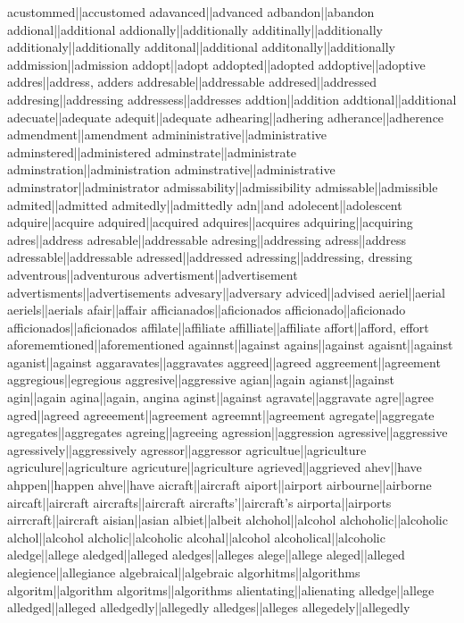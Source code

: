 acustommed||accustomed
adavanced||advanced
adbandon||abandon
addional||additional
addionally||additionally
additinally||additionally
additionaly||additionally
additonal||additional
additonally||additionally
addmission||admission
addopt||adopt
addopted||adopted
addoptive||adoptive
addres||address, adders
addresable||addressable
addresed||addressed
addresing||addressing
addressess||addresses
addtion||addition
addtional||additional
adecuate||adequate
adequit||adequate
adhearing||adhering
adherance||adherence
admendment||amendment
admininistrative||administrative
adminstered||administered
adminstrate||administrate
adminstration||administration
adminstrative||administrative
adminstrator||administrator
admissability||admissibility
admissable||admissible
admited||admitted
admitedly||admittedly
adn||and
adolecent||adolescent
adquire||acquire
adquired||acquired
adquires||acquires
adquiring||acquiring
adres||address
adresable||addressable
adresing||addressing
adress||address
adressable||addressable
adressed||addressed
adressing||addressing, dressing
adventrous||adventurous
advertisment||advertisement
advertisments||advertisements
advesary||adversary
adviced||advised
aeriel||aerial
aeriels||aerials
afair||affair
afficianados||aficionados
afficionado||aficionado
afficionados||aficionados
affilate||affiliate
affilliate||affiliate
affort||afford, effort
aforememtioned||aforementioned
againnst||against
agains||against
agaisnt||against
aganist||against
aggaravates||aggravates
aggreed||agreed
aggreement||agreement
aggregious||egregious
aggresive||aggressive
agian||again
agianst||against
agin||again
agina||again, angina
aginst||against
agravate||aggravate
agre||agree
agred||agreed
agreeement||agreement
agreemnt||agreement
agregate||aggregate
agregates||aggregates
agreing||agreeing
agression||aggression
agressive||aggressive
agressively||aggressively
agressor||aggressor
agricultue||agriculture
agriculure||agriculture
agricuture||agriculture
agrieved||aggrieved
ahev||have
ahppen||happen
ahve||have
aicraft||aircraft
aiport||airport
airbourne||airborne
aircaft||aircraft
aircrafts||aircraft
aircrafts'||aircraft's
airporta||airports
airrcraft||aircraft
aisian||asian
albiet||albeit
alchohol||alcohol
alchoholic||alcoholic
alchol||alcohol
alcholic||alcoholic
alcohal||alcohol
alcoholical||alcoholic
aledge||allege
aledged||alleged
aledges||alleges
alege||allege
aleged||alleged
alegience||allegiance
algebraical||algebraic
algorhitms||algorithms
algoritm||algorithm
algoritms||algorithms
alientating||alienating
alledge||allege
alledged||alleged
alledgedly||allegedly
alledges||alleges
allegedely||allegedly
